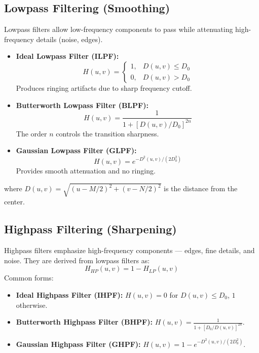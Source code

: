 \documentclass[12pt,a4paper]{AnantDocumentation}
\begin{document}
\subsection{Lowpass Filtering (Smoothing)}
Lowpass filters allow low-frequency components to pass while attenuating high-frequency details (noise, edges).
\begin{itemize}
\item \textbf{Ideal Lowpass Filter (ILPF):}
\begin{equation}
H(u,v) = 
\begin{cases} 
	1, & D(u,v) \le D_0 \\ 
	0, & D(u,v) > D_0 
\end{cases}
\end{equation}
Produces ringing artifacts due to sharp frequency cutoff.

\item \textbf{Butterworth Lowpass Filter (BLPF):}
\begin{equation}
H(u,v) = \frac{1}{1 + [D(u,v)/D_0]^{2n}}
\end{equation}
The order $n$ controls the transition sharpness.

\item \textbf{Gaussian Lowpass Filter (GLPF):}
\begin{equation}
H(u,v) = e^{-D^2(u,v)/(2D_0^2)}
\end{equation}
Provides smooth attenuation and no ringing.
\end{itemize}
where $D(u,v) = \sqrt{(u - M/2)^2 + (v - N/2)^2}$ is the distance from the center.

\subsection{Highpass Filtering (Sharpening)}
Highpass filters emphasize high-frequency components — edges, fine details, and noise. They are derived from lowpass filters as:
\begin{equation}
H_{HP}(u,v) = 1 - H_{LP}(u,v)
\end{equation}
Common forms:
\begin{itemize}
\item \textbf{Ideal Highpass Filter (IHPF):} $H(u,v)=0$ for $D(u,v)\le D_0$, $1$ otherwise.
\item \textbf{Butterworth Highpass Filter (BHPF):} $H(u,v)=\frac{1}{1+[D_0/D(u,v)]^{2n}}$.
\item \textbf{Gaussian Highpass Filter (GHPF):} $H(u,v)=1-e^{-D^2(u,v)/(2D_0^2)}$.
\end{itemize}
\end{document}
